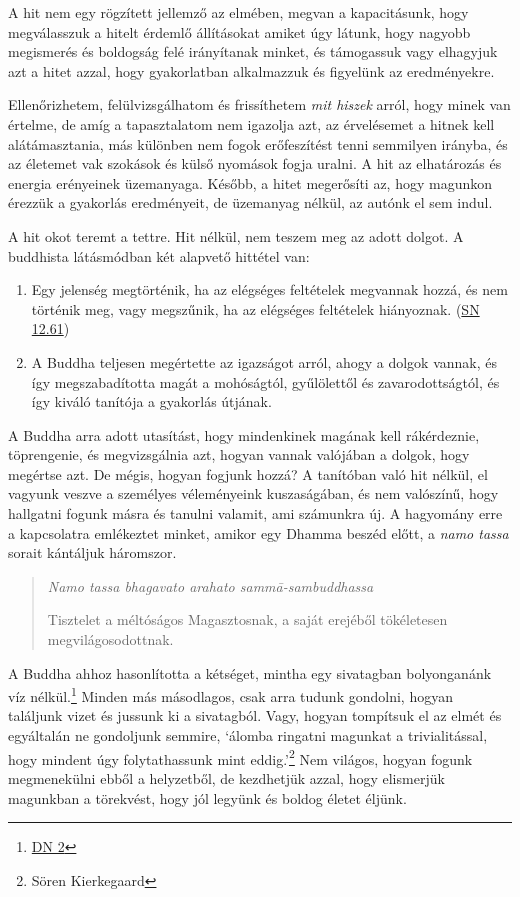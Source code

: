A hit nem egy rögzített jellemző az elmében, megvan a kapacitásunk, hogy
megválasszuk a hitelt érdemlő állításokat amiket úgy látunk, hogy
nagyobb megismerés és boldogság felé irányítanak minket, és támogassuk
vagy elhagyjuk azt a hitet azzal, hogy gyakorlatban alkalmazzuk és
figyelünk az eredményekre.

Ellenőrizhetem, felülvizsgálhatom és frissíthetem \emph{mit hiszek}
arról, hogy minek van értelme, de amíg a tapasztalatom nem igazolja azt,
az érvelésemet a hitnek kell alátámasztania, más különben nem fogok
erőfeszítést tenni semmilyen irányba, és az életemet vak szokások és
külső nyomások fogja uralni. A hit az elhatározás és energia erényeinek
üzemanyaga. Később, a hitet megerősíti az, hogy magunkon érezzük a
gyakorlás eredményeit, de üzemanyag nélkül, az autónk el sem indul.

A hit okot teremt a tettre. Hit nélkül, nem teszem meg az adott dolgot.
A buddhista látásmódban két alapvető hittétel van:

\begin{enumerate}
\item
  Egy jelenség megtörténik, ha az elégséges feltételek megvannak hozzá,
  és nem történik meg, vagy megszűnik, ha az elégséges feltételek
  hiányoznak.
  (\href{https://www.accesstoinsight.org/tipitaka/sn/sn12/sn12.061.than.html}{SN
  12.61})
\item
  A Buddha teljesen megértette az igazságot arról, ahogy a dolgok
  vannak, és így megszabadította magát a mohóságtól, gyűlölettől és
  zavarodottságtól, és így kiváló tanítója a gyakorlás útjának.
\end{enumerate}

A Buddha arra adott utasítást, hogy mindenkinek magának kell
rákérdeznie, töprengenie, és megvizsgálnia azt, hogyan vannak valójában
a dolgok, hogy megértse azt. De mégis, hogyan fogjunk hozzá? A tanítóban
való hit nélkül, el vagyunk veszve a személyes véleményeink
kuszaságában, és nem valószínű, hogy hallgatni fogunk másra és tanulni
valamit, ami számunkra új. A hagyomány erre a kapcsolatra emlékeztet
minket, amikor egy Dhamma beszéd előtt, a \emph{namo tassa} sorait
kántáljuk háromszor.

\begin{quote}
\emph{Namo tassa bhagavato arahato sammā-sambuddhassa}

Tisztelet a méltóságos Magasztosnak, a saját erejéből tökéletesen
megvilágosodottnak.
\end{quote}

A Buddha ahhoz hasonlította a kétséget, mintha egy sivatagban
bolyonganánk víz nélkül.\footnote{\href{https://suttacentral.net/dn2/en/sujato}{DN
  2}} Minden más másodlagos, csak arra tudunk gondolni, hogyan találjunk
vizet és jussunk ki a sivatagból. Vagy, hogyan tompítsuk el az elmét és
egyáltalán ne gondoljunk semmire, `álomba ringatni magunkat a
trivialitással, hogy mindent úgy folytathassunk mint eddig.'\footnote{Sören
  Kierkegaard} Nem világos, hogyan fogunk megmenekülni ebből a
helyzetből, de kezdhetjük azzal, hogy elismerjük magunkban a törekvést,
hogy jól legyünk és boldog életet éljünk.

